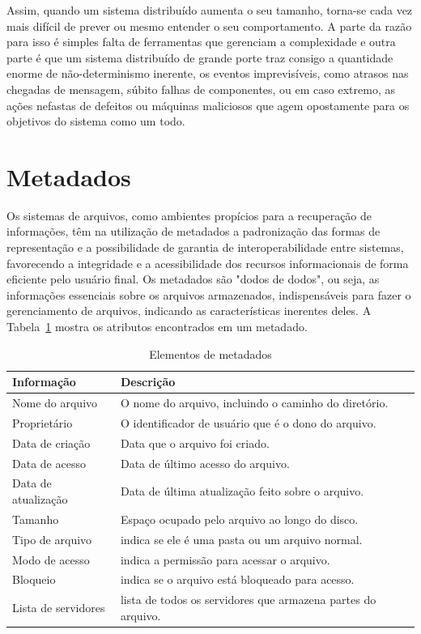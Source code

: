 	Assim, quando um sistema distribuído aumenta o seu tamanho, torna-se cada vez mais difícil de prever ou mesmo entender o seu comportamento. A parte da razão para isso é simples falta de ferramentas que gerenciam a complexidade e outra parte é que um sistema distribuído de grande porte traz consigo a quantidade enorme de não-determinismo inerente, os eventos imprevisíveis, como atrasos nas chegadas de mensagem, súbito falhas de componentes, ou em caso extremo, as ações nefastas de defeitos ou máquinas maliciosos que agem opostamente para os objetivos do sistema como um todo.
	
		\section{Metadados} 
		
		Os sistemas de arquivos, como ambientes propícios para a recuperação de informações, têm na utilização de metadados a padronização das formas de representação e a possibilidade de garantia de interoperabilidade entre sistemas, favorecendo a integridade e a acessibilidade dos recursos informacionais de forma eficiente pelo usuário final. Os metadados são "dodos de dodos", ou seja, as informações essenciais sobre os arquivos armazenados, indispensáveis para fazer o gerenciamento de arquivos, indicando as características inerentes deles. A Tabela~\ref{tab:metadado} mostra os atributos encontrados em um metadado.
		
		\capstartfalse
		\begin{table} [htb]
			\caption{Elementos de metadados}
			\centering
			\begin{tabular}{|l|l|} \hline
				\textbf{Informação} & \textbf{Descrição} \\ \hline
				
				Nome do arquivo		& O nome do arquivo, incluindo o caminho do diretório.\\ \hline
				Proprietário		& O identificador de usuário que é o dono do arquivo.\\ \hline
				Data de criação     & Data que o arquivo foi criado.\\ \hline
				Data de acesso		& Data de último acesso do arquivo. \\ \hline
				Data de atualização	& Data de última atualização feito sobre o arquivo. \\ \hline
				Tamanho				& Espaço ocupado pelo arquivo ao longo do disco. \\ \hline
				Tipo de arquivo		& indica se ele é uma pasta ou um arquivo normal.  \\ \hline
				Modo de acesso		& indica a permissão para acessar o arquivo. \\ \hline
				Bloqueio			& indica se o arquivo está bloqueado para acesso. \\ \hline
				Lista de servidores	& lista de todos os servidores que armazena partes do arquivo. \\ \hline
				
			\end{tabular}
			\label{tab:metadado}
		\end{table}
		\capstarttrue
	
